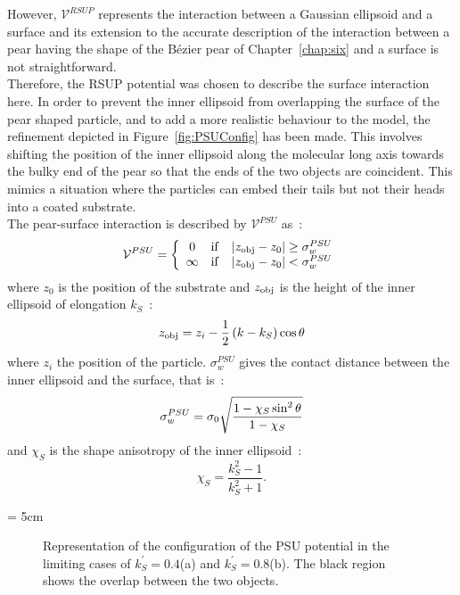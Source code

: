 However, $\mathcal{V}^{RSUP}$ represents the interaction between a Gaussian ellipsoid and a
surface and its extension to the accurate description of the interaction between a pear 
having the shape of the B\'ezier pear of Chapter~\ref{chap:six} and a surface is not
straightforward.\\
%
Therefore, the RSUP potential was chosen to describe the surface interaction here. 
In order to prevent the inner ellipsoid from overlapping the surface of 
the pear shaped particle, and to add a more realistic behaviour to the model, the refinement 
depicted in Figure~\ref{fig:PSUConfig} has been made. This involves shifting the position of the 
inner ellipsoid along the molecular long axis towards the bulky end of the pear so that the ends of the 
two objects are coincident. This mimics a situation where the particles can embed their tails but
not their heads into a coated substrate.\\
The pear-surface interaction is described by $\mathcal{V}^{PSU}$ as~:
%
\begin{equation}
	\mathcal{V}^{PSU} = \left\{	%
	\begin{array}{ccc}
		0	&\mathrm{if}	&|z_\mrm{obj} - z_0| \geq \sigma^{PSU}_w	\\
		\infty	&\mathrm{if}	&|z_\mrm{obj} - z_0| < \sigma^{PSU}_w	
	\end{array}
	\right.
\end{equation}
%
where $z_0$ is the position of the substrate and $z_{\mathrm{obj}}$ is the height of the inner
ellipsoid of elongation $k_S$~:
\begin{equation}
	z_{\mathrm{obj}} = z_i - \frac{1}{2}\left( k - k_S\right)\cos\theta
\end{equation}
where $z_i$ the position of the particle. $\sigma^{PSU}_w$ gives the contact distance 
between the inner ellipsoid and the surface, that is~:
\begin{equation}
	\sigma^{PSU}_w = \sigma_0\sqrt{\frac{1-\chi_S\sin^2\theta}{1-\chi_S}}
\end{equation}
and $\chi_S$ is the shape anisotropy of the inner ellipsoid~:
\begin{equation}
	\chi_S = \frac{k^2_S-1}{k^2_S+1}.
\end{equation}

\picW = 5cm
\begin{figure}
	\centering
	\caption{Representation of the configuration of the PSU potential in the limiting cases
	of $k^\prime_S = 0.4$(a) and $k^\prime_S = 0.8$(b). The black region shows the overlap
	between the two objects.}
	\label{fig:PSU_limitCase}
\end{figure}

